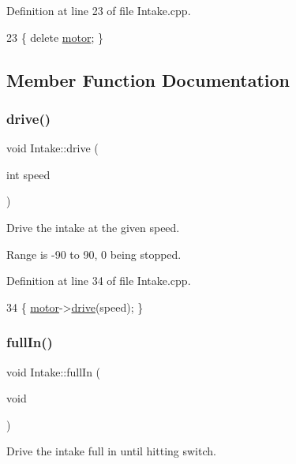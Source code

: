 Definition at line 23 of file Intake.\+cpp.


\begin{DoxyCode}
23 \{ \textcolor{keyword}{delete} \hyperlink{class_intake_abfffad571bacf945d6a2a121f59869fd}{motor}; \}
\end{DoxyCode}


\subsection{Member Function Documentation}
\mbox{\label{class_intake_a582133b5ce9d5bba8d84b6135a16deb7}} 
\subsubsection{\texorpdfstring{drive()}{drive()}}
{\footnotesize\ttfamily void Intake\+::drive (\begin{DoxyParamCaption}\item[{int}]{speed }\end{DoxyParamCaption})}



Drive the intake at the given speed. 

Range is -\/90 to 90, 0 being stopped. 

Definition at line 34 of file Intake.\+cpp.


\begin{DoxyCode}
34 \{ \hyperlink{class_intake_abfffad571bacf945d6a2a121f59869fd}{motor}->\hyperlink{class_v_e_x_motor_ac8ab5c30e4be4a9e3ed290e7827bcf1a}{drive}(speed); \}
\end{DoxyCode}
\mbox{\label{class_intake_a8582bcb135b9700923940a7b44d233ef}} 
\subsubsection{\texorpdfstring{full\+In()}{fullIn()}}
{\footnotesize\ttfamily void Intake\+::full\+In (\begin{DoxyParamCaption}\item[{void}]{ }\end{DoxyParamCaption})}



Drive the intake full in until hitting switch. 



